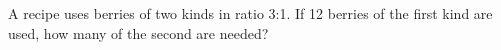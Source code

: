 A recipe uses berries of two kinds in ratio 3:1. If 12 berries of the first kind are used, how many of the second are needed?
